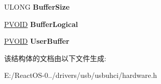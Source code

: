 \begin{DoxyCompactItemize}
\item 
\mbox{\label{struct___u_h_c_i___t_r_a_n_s_f_e_r___d_e_s_c_r_i_p_t_o_r_a45a8ec80e28c98c738ac9fbf7d38dade}} 
U\+L\+O\+NG {\bfseries Buffer\+Size}
\item 
\mbox{\label{struct___u_h_c_i___t_r_a_n_s_f_e_r___d_e_s_c_r_i_p_t_o_r_adbd61cf2c20592582e560758cf4bc08b}} 
\hyperlink{interfacevoid}{P\+V\+O\+ID} {\bfseries Buffer\+Logical}
\item 
\mbox{\label{struct___u_h_c_i___t_r_a_n_s_f_e_r___d_e_s_c_r_i_p_t_o_r_ad18b87ea44b3cd5b08f4fe236461d7dc}} 
\hyperlink{interfacevoid}{P\+V\+O\+ID} {\bfseries User\+Buffer}
\end{DoxyCompactItemize}


该结构体的文档由以下文件生成\+:\begin{DoxyCompactItemize}
\item 
E\+:/\+React\+O\+S-\/0../drivers/usb/usbuhci/hardware.\+h\end{DoxyCompactItemize}
